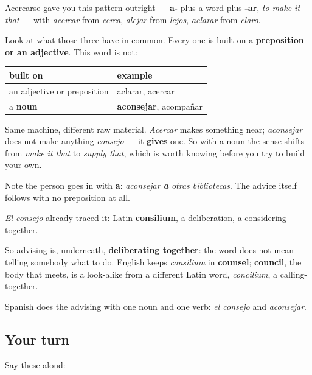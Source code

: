 \begin{grammarlens}[title={Grammar Lens: the same machine, a different part fed into it}]
Acercarse gave you this pattern outright — \textbf{a-} plus a word plus \textbf{-ar}, \emph{to make it that} — with \emph{acercar} from \emph{cerca}, \emph{alejar} from \emph{lejos}, \emph{aclarar} from \emph{claro}.

Look at what those three have in common. Every one is built on a \textbf{preposition or an adjective}. This word is not:

\noindent
\begin{tabularx}{\linewidth}{@{}>{\raggedright\arraybackslash}X>{\raggedright\arraybackslash}X@{}}
\toprule
\textbf{built on} & \textbf{example} \\
\midrule
an adjective or preposition & aclarar, acercar \\
a \textbf{noun} & \textbf{aconsejar}, acompañar \\
\bottomrule
\end{tabularx}

Same machine, different raw material. \emph{Acercar} makes something near; \emph{aconsejar} does not make anything \emph{consejo} — it \textbf{gives} one. So with a noun the sense shifts from \emph{make it that} to \emph{supply that}, which is worth knowing before you try to build your own.

Note the person goes in with \textbf{a}: \emph{aconsejar \textbf{a} otras bibliotecas}. The advice itself follows with no preposition at all.
\end{grammarlens}

\begin{cousinweb}
\emph{El consejo} already traced it: Latin \textbf{consilium}, a deliberation, a considering together.

So advising is, underneath, \textbf{deliberating together}: the word does not mean telling somebody what to do. English keeps \emph{consilium} in \textbf{counsel}; \textbf{council}, the body that meets, is a look-alike from a different Latin word, \emph{concilium}, a calling-together.

Spanish does the advising with one noun and one verb: \emph{el consejo} and \emph{aconsejar}.
\end{cousinweb}

\subsection*{Your turn}
Say these aloud:


